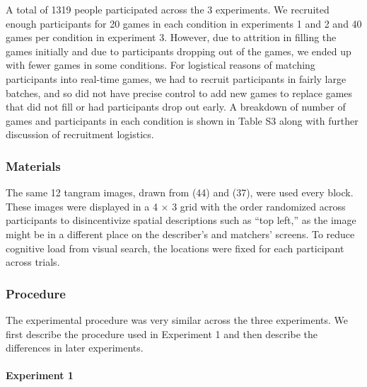 \documentclass[9pt,twocolumn,twoside]{pnas-new}
\begin{document}
{A total of 1319 people participated across the 3 experiments. We
recruited enough participants for 20 games in each condition in
experiments 1 and 2 and 40 games per condition in experiment 3. However,
due to attrition in filling the games initially and due to participants
dropping out of the games, we ended up with fewer games in some
conditions. For logistical reasons of matching participants into
real-time games, we had to recruit participants in fairly large batches,
and so did not have precise control to add new games to replace games
that did not fill or had participants drop out early. A breakdown of
number of games and participants in each condition is shown in Table
S3 along with further discussion of recruitment logistics.

\subsubsection*{Materials}\label{materials}

The same 12 tangram images, drawn from (44) and (37), were used every
block. These images were displayed in a 4 \(\times\) 3 grid with the
order randomized across participants to disincentivize spatial
descriptions such as ``top left,'' as the image might be in a different
place on the describer's and matchers' screens. To reduce cognitive load
from visual search, the locations were fixed for each participant across
trials.

\subsubsection*{Procedure}\label{procedure}

The experimental procedure was very similar across the three
experiments. We first describe the procedure used in Experiment 1 and
then describe the differences in later experiments.

\paragraph{Experiment 1}

}
\end{document}
